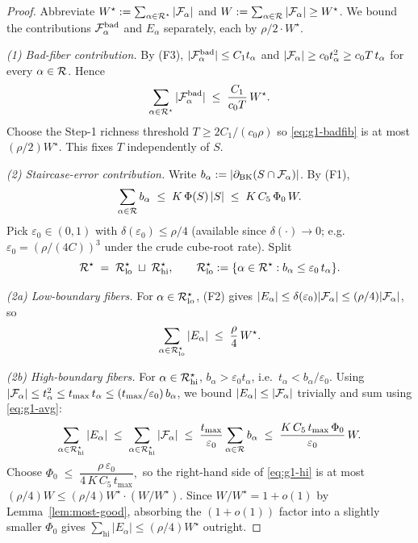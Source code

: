 \begin{proof}
Abbreviate $W^\star:=\sum_{\alpha\in\mathcal{R}^\star}|\mathcal{F}_{\alpha}|$ and
$W:=\sum_{\alpha\in\mathcal{R}}|\mathcal{F}_{\alpha}|\ge W^\star$.  We bound the
contributions $\mathcal{F}_{\alpha}^{\mathrm{bad}}$ and $E_\alpha$ separately,
each by $\rho/2\cdot W^\star$.

\medskip\noindent\emph{(1) Bad-fiber contribution.}
By (F3), $|\mathcal{F}_{\alpha}^{\mathrm{bad}}|\le C_1
t_\alpha$ and $|\mathcal{F}_{\alpha}|\ge c_0 t_\alpha^2\ge c_0 T\,t_\alpha$ for
every $\alpha\in\mathcal{R}$.  Hence
\begin{equation}\label{eq:g1-badfib}
\sum_{\alpha\in\mathcal{R}^\star}|\mathcal{F}_{\alpha}^{\mathrm{bad}}|
 \;\le\;\frac{C_1}{c_0 T}\,W^\star.
\end{equation}
Choose the Step-1 richness threshold $T\ge 2C_1/(c_0\rho)$ so
\eqref{eq:g1-badfib} is at most $(\rho/2)W^\star$.  This fixes $T$
independently of $S$.

\medskip\noindent\emph{(2) Staircase-error contribution.}
Write $b_\alpha:=|\partial_{\mathrm{BK}}(S\cap\mathcal{F}_{\alpha})|$.  By (F1),
\begin{equation}\label{eq:g1-avg}
\sum_{\alpha\in\mathcal{R}}b_\alpha\;\le\;K\,\Phi(S)\,|S|
 \;\le\;K\,C_5\,\Phi_0\,W.
\end{equation}
Pick $\varepsilon_0\in(0,1)$ with $\delta(\varepsilon_0)\le\rho/4$ (available
since $\delta(\cdot)\to0$; e.g.\ $\varepsilon_0=(\rho/(4C))^3$ under the
crude cube-root rate).  Split
\[
\mathcal{R}^\star
 \;=\;
 \mathcal{R}^\star_{\mathrm{lo}}\;\sqcup\;\mathcal{R}^\star_{\mathrm{hi}},
\qquad
\mathcal{R}^\star_{\mathrm{lo}}
 :=\{\alpha\in\mathcal{R}^\star : b_\alpha\le\varepsilon_0\,t_\alpha\}.
\]

\emph{(2a) Low-boundary fibers.}
For $\alpha\in\mathcal{R}^\star_{\mathrm{lo}}$, (F2) gives
$|E_\alpha|\le\delta(\varepsilon_0)|\mathcal{F}_{\alpha}|\le(\rho/4)|\mathcal{F}_{\alpha}|$,
so
\begin{equation}\label{eq:g1-lo}
\sum_{\alpha\in\mathcal{R}^\star_{\mathrm{lo}}}|E_\alpha|
 \;\le\;\frac{\rho}{4}\,W^\star.
\end{equation}

\emph{(2b) High-boundary fibers.}
For $\alpha\in\mathcal{R}^\star_{\mathrm{hi}}$, $b_\alpha>\varepsilon_0
t_\alpha$, i.e.\ $t_\alpha<b_\alpha/\varepsilon_0$.  Using
$|\mathcal{F}_{\alpha}|\le t_\alpha^2\le t_{\max}\,t_\alpha\le
(t_{\max}/\varepsilon_0)\,b_\alpha$, we bound
$|E_\alpha|\le|\mathcal{F}_{\alpha}|$ trivially and sum using
\eqref{eq:g1-avg}:
\begin{equation}\label{eq:g1-hi}
\sum_{\alpha\in\mathcal{R}^\star_{\mathrm{hi}}}|E_\alpha|
 \;\le\;\sum_{\alpha\in\mathcal{R}^\star_{\mathrm{hi}}}|\mathcal{F}_{\alpha}|
 \;\le\;\frac{t_{\max}}{\varepsilon_0}
        \sum_{\alpha\in\mathcal{R}}b_\alpha
 \;\le\;\frac{K\,C_5\,t_{\max}\,\Phi_0}{\varepsilon_0}\,W.
\end{equation}
Choose
\(
\Phi_0
 \;\le\;
 \dfrac{\rho\,\varepsilon_0}{4\,K\,C_5\,t_{\max}},
\)
so the right-hand side of \eqref{eq:g1-hi} is at most
$(\rho/4)W\le(\rho/4)W^\star\cdot(W/W^\star)$.  Since
$W/W^\star=1+o(1)$ by Lemma~\ref{lem:most-good}, absorbing the
$(1+o(1))$ factor into a slightly smaller $\Phi_0$ gives
$\sum_{\mathrm{hi}}|E_\alpha|\le(\rho/4)W^\star$ outright.


\end{proof}
